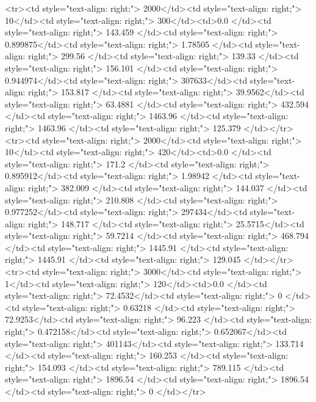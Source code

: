 <tr><td style="text-align: right;">      2000</td><td style="text-align: right;">        10</td><td style="text-align: right;">           300</td><td>0.0          </td><td style="text-align: right;">               143.459 </td><td style="text-align: right;">           0.899875</td><td style="text-align: right;">         1.78505 </td><td style="text-align: right;">        299.56  </td><td style="text-align: right;">           139.33  </td><td style="text-align: right;">             156.101   </td><td style="text-align: right;">             0.944974</td><td style="text-align: right;">              307633</td><td style="text-align: right;">                      153.817 </td><td style="text-align: right;">            39.9562</td><td style="text-align: right;">                63.4881 </td><td style="text-align: right;">       432.594 </td><td style="text-align: right;">   1463.96 </td><td style="text-align: right;">      1463.96 </td><td style="text-align: right;">                125.379 </td></tr>
<tr><td style="text-align: right;">      2000</td><td style="text-align: right;">        10</td><td style="text-align: right;">           420</td><td>0.0          </td><td style="text-align: right;">               171.2   </td><td style="text-align: right;">           0.895912</td><td style="text-align: right;">         1.98942 </td><td style="text-align: right;">        382.009 </td><td style="text-align: right;">           144.037 </td><td style="text-align: right;">             210.808   </td><td style="text-align: right;">             0.977252</td><td style="text-align: right;">              297434</td><td style="text-align: right;">                      148.717 </td><td style="text-align: right;">            25.5715</td><td style="text-align: right;">                59.7214 </td><td style="text-align: right;">       468.794 </td><td style="text-align: right;">   1445.91 </td><td style="text-align: right;">      1445.91 </td><td style="text-align: right;">                129.045 </td></tr>
<tr><td style="text-align: right;">      3000</td><td style="text-align: right;">         1</td><td style="text-align: right;">           120</td><td>0.0          </td><td style="text-align: right;">                72.4532</td><td style="text-align: right;">           0       </td><td style="text-align: right;">         0.63218 </td><td style="text-align: right;">         72.9253</td><td style="text-align: right;">            96.223 </td><td style="text-align: right;">               0.472158</td><td style="text-align: right;">             0.652067</td><td style="text-align: right;">              401143</td><td style="text-align: right;">                      133.714 </td><td style="text-align: right;">           160.253 </td><td style="text-align: right;">               154.093  </td><td style="text-align: right;">       789.115 </td><td style="text-align: right;">   1896.54 </td><td style="text-align: right;">      1896.54 </td><td style="text-align: right;">                  0     </td></tr>

